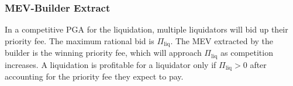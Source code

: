 \subsubsection{MEV-Builder Extract}
In a competitive PGA for the liquidation, multiple liquidators will bid up their priority fee. The maximum rational bid is $\Pi_{\text{liq}}$. The MEV extracted by the builder is the winning priority fee, which will approach $\Pi_{\text{liq}}$ as competition increases. A liquidation is profitable for a liquidator only if $\Pi_{\text{liq}} > 0$ after accounting for the priority fee they expect to pay.